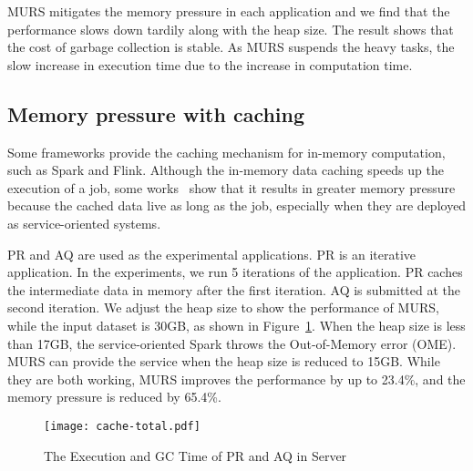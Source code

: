 MURS mitigates the memory pressure in each application and we find that the performance slows down tardily along with the heap size. The result shows that the cost of garbage collection is stable. As MURS suspends the heavy tasks, the slow increase in execution time due to the increase in computation time.  

\begin{comment}
\begin{figure}[!t]
\centering
\texttt{[image: active-task.pdf]}
\caption{The minimum active tasks in each server}
\label{fig:active-task}
\end{figure}
\end{comment}

\subsection{Memory pressure with caching}

Some frameworks provide the caching mechanism for in-memory computation, such as Spark and Flink. Although the in-memory data caching speeds up the execution of a job, some works~\cite{bu:bloat, nguyen2015facade} show that it results in greater memory pressure because the cached data live as long as the job, especially when they are deployed as service-oriented systems. 

PR and AQ are used as the experimental applications. PR is an iterative application. In the experiments, we run 5 iterations of the application. PR caches the intermediate data in memory after the first iteration. AQ is submitted at the second iteration. 
We adjust the heap size to show the performance of MURS, while the input dataset is 30GB, as shown in Figure~\ref{fig:cache-total}. When the heap size is less than 17GB, the service-oriented Spark throws the Out-of-Memory error (OME). MURS can provide the service when the heap size is reduced to 15GB. While they are both working, MURS improves the performance by up to 23.4\%, and the memory pressure is reduced by 65.4\%.

\begin{figure}[!t]
\centering
\texttt{[image: cache-total.pdf]}
\vspace{-2mm}
\caption{The Execution and GC Time of PR and AQ in Server}
\vspace{-4mm}
\label{fig:cache-total}
\end{figure}


